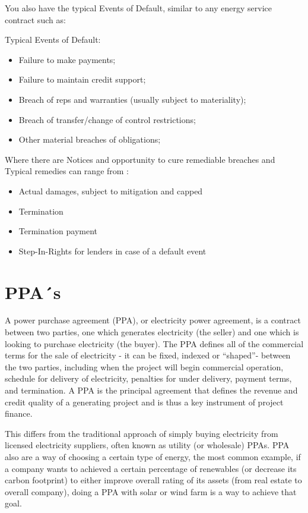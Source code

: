\documentclass[]{book}
\theoremstyle{definition}
\theoremstyle{definition}
\theoremstyle{definition}
\theoremstyle{remark}
\begin{document}
You also have the typical Events of Default, similar to any energy
service contract such as:

Typical Events of Default:

\begin{itemize}
\item
  Failure to make payments;
\item
  Failure to maintain credit support;
\item
  Breach of reps and warranties (usually subject to materiality);
\item
  Breach of transfer/change of control restrictions;
\item
  Other material breaches of obligations;
\end{itemize}

Where there are Notices and opportunity to cure remediable breaches and
Typical remedies can range from :

\begin{itemize}
\item
  Actual damages, subject to mitigation and capped
\item
  Termination
\item
  Termination payment
\item
  Step-In-Rights for lenders in case of a default event
\end{itemize}

\section{PPA´s}\label{ppas}

A power purchase agreement (PPA), or electricity power agreement, is a
contract between two parties, one which generates electricity (the
seller) and one which is looking to purchase electricity (the buyer).
The PPA defines all of the commercial terms for the sale of electricity
- it can be fixed, indexed or ``shaped''- between the two parties,
including when the project will begin commercial operation, schedule for
delivery of electricity, penalties for under delivery, payment terms,
and termination. A PPA is the principal agreement that defines the
revenue and credit quality of a generating project and is thus a key
instrument of project finance.

This differs from the traditional approach of simply buying electricity
from licensed electricity suppliers, often known as utility (or
wholesale) PPAs. PPA also are a way of choosing a certain type of
energy, the most common example, if a company wants to achieved a
certain percentage of renewables (or decrease its carbon footprint) to
either improve overall rating of its assets (from real estate to overall
company), doing a PPA with solar or wind farm is a way to achieve that
goal.
\end{document}
